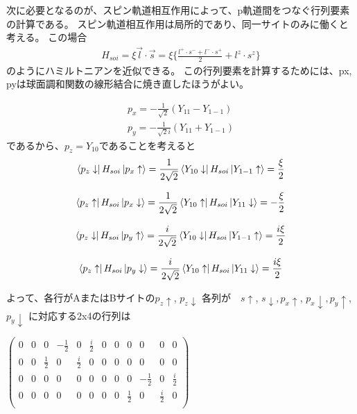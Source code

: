 \documentclass{article}
\begin{document}
次に必要となるのが、スピン軌道相互作用によって、p軌道間をつなぐ行列要素の計算である。
スピン軌道相互作用は局所的であり、同一サイトのみに働くと考える。
この場合
\begin{eqnarray}
H_{soi}=\xi \vec{l}\cdot\vec{s} =\xi \{\frac{l^+\cdot s^- + l^-\cdot s^+}{2}
+l^z \cdot s^z
\}
\end{eqnarray}
のようにハミルトニアンを近似できる。
この行列要素を計算するためには、px, pyは球面調和関数の線形結合に焼き直したほうがよい。

\begin{eqnarray}
p_x=-\frac{1}{\sqrt{2}} (Y_{11}-Y_{1-1}) \\
p_y=-\frac{1}{\sqrt{2}i} (Y_{11}+Y_{1-1})
\end{eqnarray}
であるから、$p_z=Y_{10}$であることを考えると
\begin{eqnarray}
\Bra{p_z \downarrow} H_{soi}\Ket{p_x \uparrow} =\frac{1}{2\sqrt{2}}\Bra{Y_{10}
\downarrow} H_{soi} \Ket{Y_{1-1} \uparrow} =\frac{\xi}{2}
\end{eqnarray}

\begin{eqnarray}
\Bra{p_z \uparrow} H_{soi} \Ket{p_x \downarrow} =\frac{1}{2\sqrt{2}} \Bra{Y_{10}
\uparrow} H_{soi} \Ket{Y_{11} \downarrow} =-\frac{\xi}{2}
\end{eqnarray}

\begin{eqnarray}
\Bra{p_z \downarrow} H_{soi}\Ket{p_y \uparrow} =\frac{i}{2\sqrt{2}}\Bra{Y_{10}
\downarrow} H_{soi}\Ket{Y_{1-1} \uparrow} =\frac{i\xi}{2}
\end{eqnarray}

\begin{eqnarray}
\Bra{p_z \uparrow} H_{soi}\Ket{p_y \downarrow} =\frac{i}{2\sqrt{2}}\Bra{Y_{10}
\uparrow} H_{soi}\Ket{Y_{11} \downarrow} =\frac{i\xi}{2}
\end{eqnarray}

よって、各行がAまたはBサイトの$p_z \uparrow$, $p_z \downarrow$ 各列が　$s \uparrow$, $s
\downarrow, p_x \uparrow$, $p_x \downarrow, p_y \uparrow$, $p_y \downarrow$
に対応する2x4の行列は

\begin{doublespace}
\noindent\(\left(
\begin{array}{cccccccccccc}
 0 & 0 & 0 & -\frac{1}{2} & 0 & \frac{i}{2} & 0 & 0 & 0 & 0 & 0 & 0 \\
 0 & 0 & \frac{1}{2} & 0 & \frac{i}{2} & 0 & 0 & 0 & 0 & 0 & 0 & 0 \\
 0 & 0 & 0 & 0 & 0 & 0 & 0 & 0 & 0 & -\frac{1}{2} & 0 & \frac{i}{2} \\
 0 & 0 & 0 & 0 & 0 & 0 & 0 & 0 & \frac{1}{2} & 0 & \frac{i}{2} & 0 \\
\end{array}
\right)\)
\end{doublespace}
\end{document}
